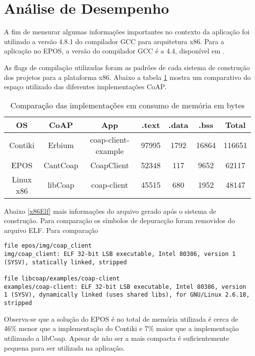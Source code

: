 \section{An\'alise de Desempenho}

A fim de mensurar algumas informa\c{c}\~oes importantes no contexto da aplica\c{c}\~ao foi utilizado a vers\~ao 4.8.1 do compilador GCC para arquitetura x86. Para a aplica\c{c}\~ao no EPOS,  a vers\~ao do compilador GCC \'e a 4.4, dispon\'ivel em \cite{eposProject}.

As flags de compila\c{c}\~ao utilizadas foram as padr\~oes de cada sistema de constru\c{c}\~ao dos projetos para a plataforma x86. Abaixo a tabela \ref{comparacaoCoap} mostra um comparativo do espa\c{c}o utilizado das diferentes implementa\c{c}\~oes CoAP.

\begin{table}[H]
\label{comparacaoCoap}
\centering
\begin{tabular}{@{}ccccccc@{}}
    \toprule
    OS & CoAP & App & .text & .data & .bss & Total\\ \midrule
    Contiki & Erbium & coap-client-example & 97995 & 1792 & 16864 & 116651 \\
    EPOS & CantCoap & CoapClient & 52348 & 117 & 9652 & 62117 \\
    Linux x86\textunderscore 32 & libCoap & coap-client & 45515 & 680 & 1952 & 48147\\
    \bottomrule
\end{tabular}
\caption{Compara\c{c}\~ao das implementa\c{c}\~oes em consumo de mem\'oria em bytes}
\end{table}

Abaixo \ref{x86Elf} mais informa\c{c}\~oes do arquivo gerado ap\'os o sistema de constru\c{c}\~ao. Para compara\c{c}\~ao os s\'imbolos de depurac\c{c}\~ao foram removidos do arquivo ELF. Para compara\c{c}\~ao 

\begin{lstlisting}[label={x86Elf},caption=Verificando o tipo de arquivod gerado no Linux utilizando a ferramenta file.]
file epos/img/coap_client
img/coap_client: ELF 32-bit LSB executable, Intel 80386, version 1 (SYSV), statically linked, stripped

file libcoap/examples/coap-client
examples/coap-client: ELF 32-bit LSB executable, Intel 80386, version 1 (SYSV), dynamically linked (uses shared libs), for GNU/Linux 2.6.18, stripped
\end{lstlisting}


Observa-se que a solu\c{c}\~ao do EPOS \'e no total de mem\'oria utilizada \'e cerca de 46\% menor que a implementa\c{c}\~ao do Contiki e 7\% maior que a implementa\c{c}\~ao utilizando a libCoap. Apesar de n\~ao ser a mais compacta \'e suficientemente pequena para ser utilizada na aplica\c{c}\~ao.

